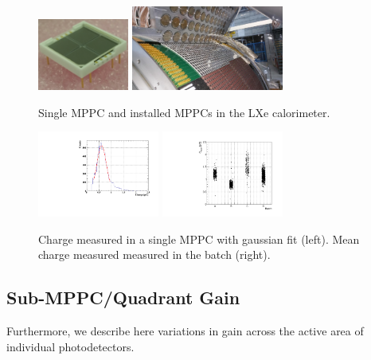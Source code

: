 \begin{figure}
\includegraphics[width=3cm]{plots/single_mppc.jpg}
\includegraphics[width=5cm]{plots/CFRP_spacer_MPPC.jpg}
\caption{Single MPPC and installed MPPCs in the LXe calorimeter.}
\label{fig:mppc} 
\end{figure}

\begin{figure}
\includegraphics[width=4cm]{graphics/q64fit.pdf}
\includegraphics[width=4cm]{plots/2018/qmean_vs_batch.pdf}
\caption{Charge measured in a single MPPC with gaussian fit (left).
Mean charge measured measured in the batch (right). }
\label{fig:mppccharge} 
\end{figure}


\subsection{Sub-MPPC/Quadrant Gain}
Furthermore, we describe here variations in gain across the active area of individual photodetectors.

